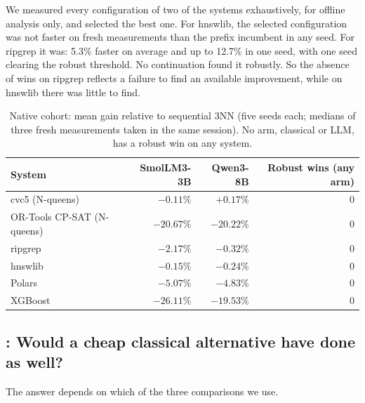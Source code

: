We measured every configuration of two of the systems exhaustively, for offline analysis only, and selected the best one. For hnswlib, the selected configuration was not faster on fresh measurements than the prefix incumbent in any seed. For ripgrep it was: 5.3\% faster on average and up to 12.7\% in one seed, with one seed clearing the robust threshold. No continuation found it robustly. So the absence of wins on ripgrep reflects a failure to find an available improvement, while on hnswlib there was little to find.

\begin{table}[t]
\centering
\caption{Native cohort: mean gain relative to sequential 3NN (five seeds each; medians of three fresh measurements taken in the same session). No arm, classical or LLM, has a robust win on any system.}
\label{tab:native}
\small
\begin{tabular}{lrrr}
\toprule
System & SmolLM3-3B & Qwen3-8B & Robust wins (any arm) \\
\midrule
cvc5 (N-queens) & $-0.11\%$ & $+0.17\%$ & 0 \\
OR-Tools CP-SAT (N-queens) & $-20.67\%$ & $-20.22\%$ & 0 \\
ripgrep & $-2.17\%$ & $-0.32\%$ & 0 \\
hnswlib & $-0.15\%$ & $-0.24\%$ & 0 \\
Polars & $-5.07\%$ & $-4.83\%$ & 0 \\
XGBoost & $-26.11\%$ & $-19.53\%$ & 0 \\
\bottomrule
\end{tabular}
\end{table}

\subsection{: Would a cheap classical alternative have done as well?}
\label{sec:rq2}

The answer depends on which of the three comparisons we use.

